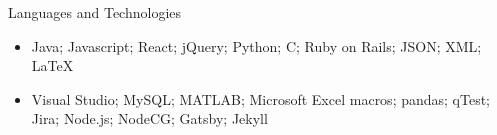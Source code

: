 \documentclass[]{mcdowellcv}
\begin{document}
	\begin{cvsection}{Languages and Technologies}
		\begin{cvsubsection}{}{}{}	
			\begin{itemize}
				\item Java; Javascript; React; jQuery; Python; C; Ruby on Rails; JSON; XML; LaTeX
				\item Visual Studio; MySQL; MATLAB; Microsoft Excel macros; pandas; qTest; Jira; Node.js; NodeCG; Gatsby; Jekyll
			\end{itemize}
		\end{cvsubsection}
	\end{cvsection}
	
\end{document}
